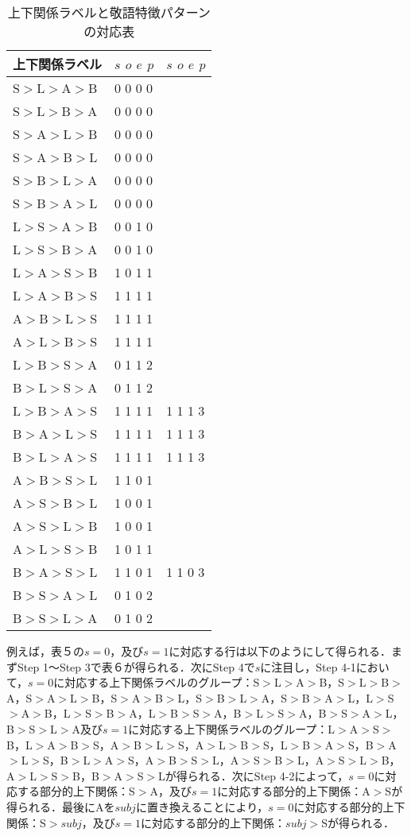 \begin{table}[htbp]
\begin{center} 
\caption{上下関係ラベルと敬語特徴パターンの対応表} 
\label{tbl:table6} 
\begin{tabular}{lll} 
\hline 
\multicolumn{1}{c}{上下関係ラベル}&\multicolumn{1}{c}{$s$ $o$ $e$ $p$}&\multicolumn{1}{c}{$s$ $o$ $e$ $p$}\\ 
\hline
S$>$L$>$A$>$B&0 0 0 0&\\
S$>$L$>$B$>$A&0 0 0 0&\\
S$>$A$>$L$>$B&0 0 0 0&\\
S$>$A$>$B$>$L&0 0 0 0&\\
S$>$B$>$L$>$A&0 0 0 0&\\
S$>$B$>$A$>$L&0 0 0 0&\\
L$>$S$>$A$>$B&0 0 1 0&\\
L$>$S$>$B$>$A&0 0 1 0&\\
L$>$A$>$S$>$B&1 0 1 1&\\
L$>$A$>$B$>$S&1 1 1 1&\\
A$>$B$>$L$>$S&1 1 1 1&\\
A$>$L$>$B$>$S&1 1 1 1&\\
L$>$B$>$S$>$A&0 1 1 2&\\
B$>$L$>$S$>$A&0 1 1 2&\\
L$>$B$>$A$>$S&1 1 1 1&1 1 1 3\\
B$>$A$>$L$>$S&1 1 1 1&1 1 1 3\\
B$>$L$>$A$>$S&1 1 1 1&1 1 1 3\\
A$>$B$>$S$>$L&1 1 0 1\\
A$>$S$>$B$>$L&1 0 0 1&\\
A$>$S$>$L$>$B&1 0 0 1&\\
A$>$L$>$S$>$B&1 0 1 1&\\
B$>$A$>$S$>$L&1 1 0 1&1 1 0 3\\
B$>$S$>$A$>$L&0 1 0 2&\\
B$>$S$>$L$>$A&0 1 0 2&\\
\hline 
\end{tabular} 
\end{center} 
\end{table} 

例えば，表５の$s=0$，及び$s=1$に対応する行は以下のようにして得られる．まずStep 1〜Step 3で表６が得られる．次にStep 4で$s$に注目し，Step 4-1において，$s=0$に対応する上下関係ラベルのグループ：S$>$L$>$A$>$B，S$>$L$>$B$>$A，S$>$A$>$L$>$B，S$>$A$>$B$>$L，S$>$B$>$L$>$A，S$>$B$>$A$>$L，L$>$S$>$A$>$B，L$>$S$>$B$>$A，L$>$B$>$S$>$A，B$>$L$>$S$>$A，B$>$S$>$A$>$L，B$>$S$>$L$>$A及び$s=1$に対応する上下関係ラベルのグループ：L$>$A$>$S$>$B，L$>$A$>$B$>$S，A$>$B$>$L$>$S，A$>$L$>$B$>$S，L$>$B$>$A$>$S，B$>$A$>$L$>$S，B$>$L$>$A$>$S，A$>$B$>$S$>$L，A$>$S$>$B$>$L，A$>$S$>$L$>$B，A$>$L$>$S$>$B，B$>$A$>$S$>$Lが得られる．次にStep 4-2によって，$s=0$に対応する部分的上下関係：S$>$A，及び$s=1$に対応する部分的上下関係：A$>$Sが得られる．最後にAを$subj$に置き換えることにより，$s=0$に対応する部分的上下関係：S$>$$subj$，及び$s=1$に対応する部分的上下関係：$subj$$>$Sが得られる．

